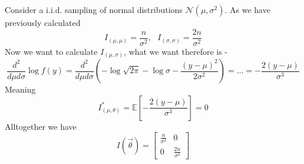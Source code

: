 \documentclass[../main.tex]{subfiles}
\begin{document}
\begin{example}
Consider a i.i.d. sampling of normal distributions $\mathcal{N}(\mu,\sigma^2)$. As we have previously calculated
\[I_{(\mu,\mu)} = \frac{n}{\sigma^2}, \text{ } I_{(\sigma,\sigma)} = \frac{2n}{\sigma^2}\]
Now we want to calculate $I_{(\mu,\sigma)}$, what we want therefore is -
\[\frac{d^2}{d\mu d\sigma} \log f(y) = \frac{d^2}{d\mu d\sigma}\left( -\log \sqrt{2\pi} - \log\sigma -\frac{(y-\mu)^2}{2\sigma^2}\right) = \dots = -\frac{2(y-\mu)}{\sigma^3}\]
Meaning
\[I^*_{(\mu,\theta)} = \mathbb{E}\left[-\frac{2(y-\mu)}{\sigma^3}\right] = 0\]
Alltogether we have
\[I(\overrightarrow{\theta}) = \begin{bmatrix} \frac{n}{\sigma^2} & 0 \\ 0 & \frac{2n}{\sigma^2}  \end{bmatrix}\]
\end{example}
\end{document}

